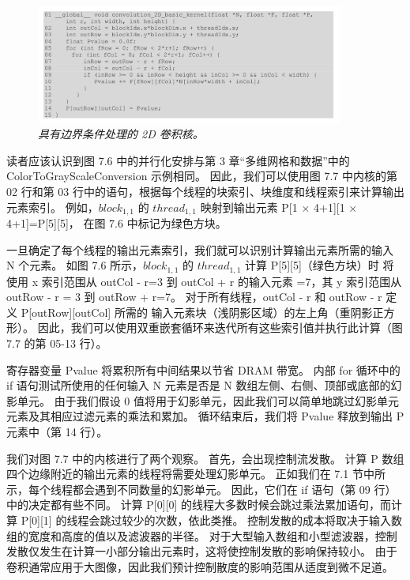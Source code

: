 \begin{figure}[H]
	\centering
	\includegraphics[width=0.9\textwidth]{figs/F7.7.png}
	\caption{\textit{具有边界条件处理的 2D 卷积核。}}
\end{figure}

读者应该认识到图 7.6 中的并行化安排与第 3 章“多维网格和数据”中的 ColorToGrayScaleConversion 示例相同。 
因此，我们可以使用图 7.7 中内核的第 02 行和第 03 行中的语句，根据每个线程的块索引、块维度和线程索引来计算输出元素索引。 
例如，$block_{1,1}$ 的 $thread_{1,1}$ 映射到输出元素 P[1 $\times$ 4+1][1 $\times$ 4+1]=P[5][5]，
在图 7.6 中标记为绿色方块。

一旦确定了每个线程的输出元素索引，我们就可以识别计算输出元素所需的输入 N 个元素。 
如图 7.6 所示，$block_{1, 1}$ 的 $thread_{1, 1}$ 计算 P[5][5]（绿色方块）时
将使用 x 索引范围从 outCol - r=3 到 outCol + r 的输入元素 =7，其 y 索引范围从 outRow - r = 3 到 outRow + r=7。 
对于所有线程，outCol - r 和 outRow - r 定义 P[outRow][outCol] 所需的
输入元素块（浅阴影区域）的左上角（重阴影正方形）。 
因此，我们可以使用双重嵌套循环来迭代所有这些索引值并执行此计算（图 7.7 的第 05-13 行）。

寄存器变量 Pvalue 将累积所有中间结果以节省 DRAM 带宽。 
内部 for 循环中的 if 语句测试所使用的任何输入 N 元素是否是 N 数组左侧、右侧、顶部或底部的幻影单元。 
由于我们假设 0 值将用于幻影单元，因此我们可以简单地跳过幻影单元元素及其相应过滤元素的乘法和累加。 
循环结束后，我们将 Pvalue 释放到输出 P 元素中（第 14 行）。

我们对图 7.7 中的内核进行了两个观察。 首先，会出现控制流发散。 
计算 P 数组四个边缘附近的输出元素的线程将需要处理幻影单元。 正如我们在 7.1 节中所示，每个线程都会遇到不同数量的幻影单元。 
因此，它们在 if 语句（第 09 行）中的决定都有些不同。 
计算 P[0][0] 的线程大多数时候会跳过乘法累加语句，而计算 P[0][1] 的线程会跳过较少的次数，依此类推。 
控制发散的成本将取决于输入数组的宽度和高度的值以及滤波器的半径。 
对于大型输入数组和小型滤波器，控制发散仅发生在计算一小部分输出元素时，这将使控制发散的影响保持较小。 
由于卷积通常应用于大图像，因此我们预计控制散度的影响范围从适度到微不足道。

